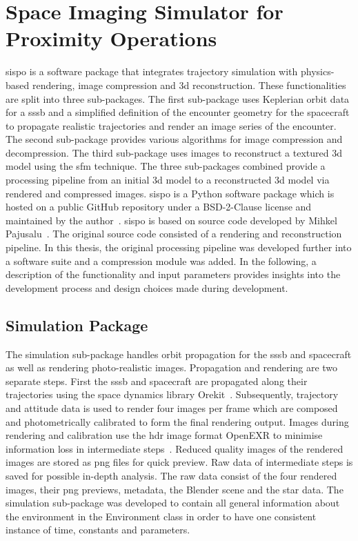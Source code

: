 \section{Space Imaging Simulator for Proximity Operations} \label{sec:sispo}
\gls{sispo} is a software package that integrates trajectory simulation with physics-based rendering, image compression and \gls{3d} reconstruction. These functionalities are split into three sub-packages. The first sub-package uses Keplerian orbit data for a \gls{sssb} and a simplified definition of the encounter geometry for the spacecraft to propagate realistic trajectories and render an image series of the encounter. The second sub-package provides various algorithms for image compression and decompression. The third sub-package uses images to reconstruct a textured \gls{3d} model using the \gls{sfm} technique. The three sub-packages combined provide a processing pipeline from an initial \gls{3d} model to a reconstructed \gls{3d} model via rendered and compressed images. \Gls{sispo} is a Python software package which is hosted on a public GitHub repository under a BSD-2-Clause license and maintained by the author~\cite{Schwarzkopf2020SpaceOperations}. \Gls{sispo} is based on source code developed by Mihkel Pajusalu~\cite{Pajusalu2019CharacterizationMapping}. The original source code consisted of a rendering and reconstruction pipeline. In this thesis, the original processing pipeline was developed further into a software suite and a compression module was added. In the following, a description of the functionality and input parameters provides insights into the development process and design choices made during development.

\subsection{Simulation Package}
The simulation sub-package handles orbit propagation for the \gls{sssb} and spacecraft as well as rendering photo-realistic images. Propagation and rendering are two separate steps. First the \gls{sssb} and spacecraft are propagated along their trajectories using the space dynamics library Orekit~\cite{orekit}. Subsequently, trajectory and attitude data is used to render four images per frame which are composed and photometrically calibrated to form the final rendering output. Images during rendering and calibration use the \gls{hdr} image format OpenEXR to minimise information loss in intermediate steps~\cite{openexr}. Reduced quality images of the rendered images are stored as \gls{png} files for quick preview. Raw data of intermediate steps is saved for possible in-depth analysis. The raw data consist of the four rendered images, their \gls{png} previews, metadata, the Blender scene and the star data. The simulation sub-package was developed to contain all general information about the environment in the Environment class in order to have one consistent instance of time, constants and parameters.

